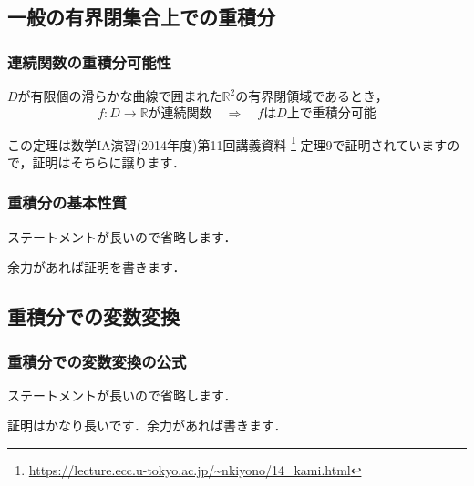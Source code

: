 \documentclass[./index]{subfiles}
\begin{document}
\setcounter{subsection}{3}
\subsection{一般の有界閉集合上での重積分}
\subsubsection{連続関数の重積分可能性}
\begin{screen}
    \begin{proposition}
        $D$が有限個の滑らかな曲線で囲まれた$\mathbb{R}^2$の有界閉領域であるとき，
        \begin{equation}
            \mbox{$f: D \rightarrow \mathbb{R}$が連続関数}
            \quad \Longrightarrow \quad
            \mbox{$f$は$D$上で重積分可能}
        \end{equation}
    \end{proposition}
\end{screen}

この定理は数学IA演習(2014年度)第11回講義資料
\footnote{\url{https://lecture.ecc.u-tokyo.ac.jp/~nkiyono/14_kami.html}}
定理9で証明されていますので，証明はそちらに譲ります．

\subsubsection{重積分の基本性質}

\begin{screen}
    ステートメントが長いので省略します．
\end{screen}

余力があれば証明を書きます．

\subsection{重積分での変数変換}
\subsubsection{重積分での変数変換の公式}
\begin{screen}
    ステートメントが長いので省略します．
\end{screen}

証明はかなり長いです．余力があれば書きます．
\end{document}
